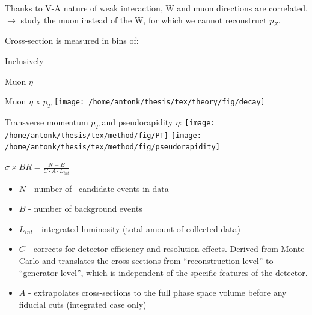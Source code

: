 {
Thanks to V-A nature of weak interaction, W and muon directions are correlated.\\
$\rightarrow$ study the muon instead of the W, for which we cannot reconstruct $p_Z$.

\vspace{.2cm}
\colb[T]
Cross-section is measured in bins of:
\iteb
\item Inclusively
\item Muon $\eta$
\item Muon $\eta$ x $p_T$
\itee
{}
\centering
\texttt{[image: /home/antonk/thesis/tex/theory/fig/decay]}
\cole

\vspace{.3cm}
Transverse momentum $p_T$ and pseudorapidity $\eta$:
\texttt{[image: /home/antonk/thesis/tex/method/fig/PT]}
\texttt{[image: /home/antonk/thesis/tex/method/fig/pseudorapidity]}

}

 {

\centering
\huge{
$\sigma \times BR = \frac{N - B}{C \cdot A \cdot L_{int} }$
}

\normalsize
\vspace{.3cm}
\begin{itemize}
\item $N$ - number of \Wboson\ candidate events in data
\item $B$ - number of background events
\item $L_{int}$ - integrated luminosity (total amount of collected data)
\item $C$ - corrects for detector efficiency and resolution effects. Derived from Monte-Carlo and translates the cross-sections from ``reconstruction level'' to ``generator level'', which is independent of the specific features of the detector.
\item $A$ - extrapolates cross-sections to the full phase space volume before any fiducial cuts (integrated case only)
\end{itemize}
}

